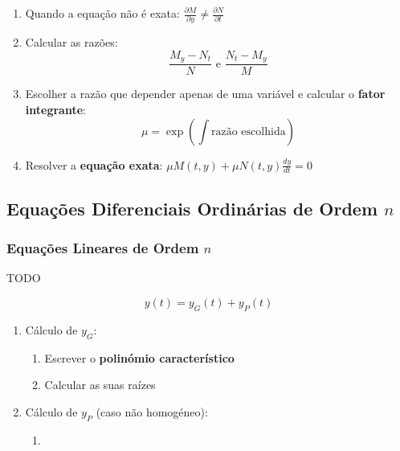 \documentclass[11pt, a4paper]{article}
\begin{document}
\begin{enumerate}
    \item Quando a equação não é exata:
          $\displaystyle \frac{\partial M}{\partial y} \neq
              \frac{\partial N}{\partial t}$
    \item Calcular as razões:
          \begin{equation*}
              \frac{M_y - N_t}{N} \text{\ \ \ \ e \ \ \ } \frac{N_t - M_y}{M}
          \end{equation*}
    \item Escolher a razão que depender apenas de uma variável e calcular o
          \textbf{fator integrante}:
          \begin{equation*}
              \mu = \exp\left(\int \text{razão escolhida}\right)
          \end{equation*}
    \item Resolver a \textbf{equação exata}:
          $\displaystyle \mu M(t,y) + \mu N(t, y)\frac{dy}{dt} = 0$

\end{enumerate}

\subsection{Equações Diferenciais Ordinárias de Ordem $n$}

\subsubsection{Equações Lineares de Ordem $n$}

TODO

\begin{equation*}
    y(t) = y_G(t) + y_P(t)
\end{equation*}

\begin{enumerate}
    \item Cálculo de $y_G$:
          \begin{enumerate}
              \item Escrever o \textbf{polinómio característico}
              \item Calcular as suas raízes
          \end{enumerate}
    \item Cálculo de $y_P$ (caso não homogéneo):
          \begin{enumerate}
              \item
          \end{enumerate}
\end{enumerate}
\end{document}

